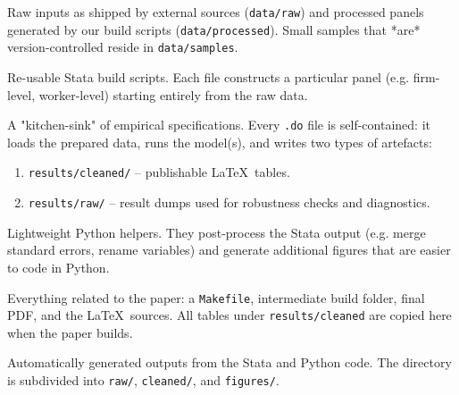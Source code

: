 \documentclass[11pt]{article}
\newcommand{\code}[1]{\texttt{#1}}
\begin{document}
\begin{description}[style=unboxed,leftmargin=0.7in]
  \item[\code{data/}]     Raw inputs as shipped by external sources (\code{data/raw})
                          and processed panels generated by our build
                          scripts (\code{data/processed}).  Small samples that
                          *are* version-controlled reside in
                          \code{data/samples}.

  \item[\code{src/}]      Re-usable Stata build scripts.  Each file constructs a
                          particular panel (e.g. firm-level, worker-level)
                          starting entirely from the raw data.

  \item[\code{spec/}]     A "kitchen-sink" of empirical specifications.  Every
                          \code{.do} file is self-contained: it loads the
                          prepared data, runs the model(s), and writes two
                          types of artefacts:
                          \begin{enumerate}[label=\alph*)]
                            \item \code{results/cleaned/} – publishable
                                  \LaTeX\ tables.
                            \item \code{results/raw/}     – result dumps used
                                  for robustness checks and diagnostics.
                          \end{enumerate}

  \item[\code{py/}]       Lightweight Python helpers.  They post-process the
                          Stata output (e.g. merge standard errors, rename
                          variables) and generate additional figures that are
                          easier to code in Python.

  \item[\code{writeup/}]  Everything related to the paper: a
                          \code{Makefile}, intermediate build folder, final
                          PDF, and the \LaTeX\ sources.  All tables under
                          \code{results/cleaned} are copied here when the paper
                          builds.

  \item[\code{results/}]  Automatically generated outputs from the Stata and
                          Python code.  The directory is subdivided into
                          \code{raw/}, \code{cleaned/}, and \code{figures/}.
\end{description}
\end{document}
